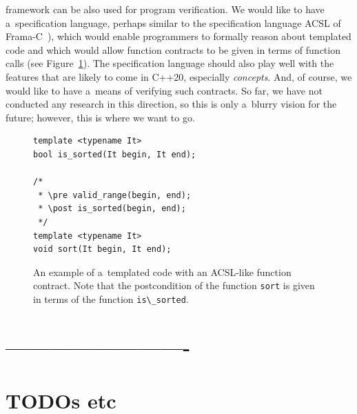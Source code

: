 \documentclass[nolot,nolof,nocover,printed]{fithesis3}
\begin{document}
\K framework can be also used for program verification. We would like to have a~specification language, perhaps similar to the specification language ACSL of Frama-C~\cite{Cuoq2012}), which would enable programmers to formally reason about templated code and which would allow function contracts to be given in terms of function calls (see Figure~\ref{fig:contractsExample}). The specification language should also play well with the features that are likely to come in C++20, especially \textit{concepts}. And, of course, we would like to have a~means of verifying such contracts. So far, we have not conducted any research in this direction, so this is only a~blurry vision for the future; however, this is where we want to go.

\begin{figure}
\begin{lstlisting}
template <typename It>
bool is_sorted(It begin, It end);

/*
 * \pre valid_range(begin, end);
 * \post is_sorted(begin, end);
 */
template <typename It>
void sort(It begin, It end);
\end{lstlisting}
\caption{An example of a~templated code with an ACSL-like function contract. Note that the postcondition of the function \lstinline|sort| is given in terms of the function \lstinline|is\_sorted|.}
\label{fig:contractsExample}
\end{figure}

\ifshowoldstuff

\chapter{-------------------------}
\chapter{TODOs etc}



\end{document}
